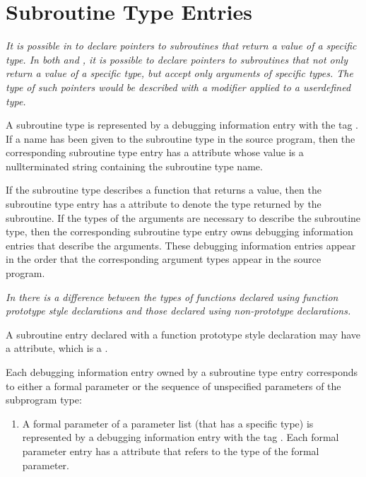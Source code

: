 {
\section{Subroutine Type Entries}
\label{chap:subroutinetypeentries}

\textit{It is possible in 
to declare pointers to subroutines
that return a value of a specific type. In both 
 and ,
it is possible to declare pointers to subroutines that not
only return a value of a specific type, but accept only
arguments of specific types. The type of such pointers would
be described with a  modifier applied to a
user\dash defined type.}

A subroutine type is represented by a debugging information
entry with the 
tag \DWTAGsubroutinetypeTARG. 
If a name has
been given to the subroutine type in the source program,
then the corresponding subroutine type entry has 
a \DWATname{} attribute 
whose value is a null\dash terminated string containing
the subroutine type name.

If the subroutine type describes a function that returns
a value, then the subroutine type entry has a
\DWATtype{}
attribute to denote the type returned by the subroutine. If
the types of the arguments are necessary to describe the
subroutine type, then the corresponding subroutine type
entry owns debugging information entries that describe the
arguments. These debugging information entries appear in the
order that the corresponding argument types appear in the
source program.

\textit{In  there 
is a difference between the types of functions
declared using function prototype style declarations and
those declared using non-prototype declarations.}

A 
\hypertarget{chap:DWATprototypedsubroutineprototype}{}
subroutine entry declared with a function prototype style
declaration may have 
a 
\DWATprototypedDEFN{} attribute, which is
a .

Each debugging information entry owned by a subroutine
type entry corresponds to either a formal parameter or the sequence of
unspecified parameters of the subprogram type:

\begin{enumerate}[1. ]
\item A formal parameter of a parameter list (that has a
specific type) is represented by a debugging information entry
with the tag \DWTAGformalparameter. 
Each formal parameter
entry has 
a \DWATtype{} attribute that refers to the type of
the formal parameter.


\end{enumerate}}
